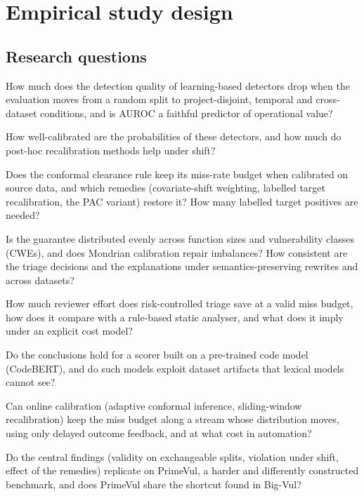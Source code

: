 \section{Empirical study design}\label{sec:design}

\subsection{Research questions}
\begin{description}[leftmargin=2.2em,style=nextline,itemsep=2pt]
\item[RQ1 (Reliability of detection).] How much does the detection quality of learning-based detectors drop when the evaluation moves from a random split to project-disjoint, temporal and cross-dataset conditions, and is AUROC a faithful predictor of operational value?
\item[RQ2 (Calibration).] How well-calibrated are the probabilities of these detectors, and how much do post-hoc recalibration methods help under shift?
\item[RQ3 (Guarantees under shift).] Does the conformal clearance rule keep its miss-rate budget when calibrated on source data, and which remedies (covariate-shift weighting, labelled target recalibration, the PAC variant) restore it? How many labelled target positives are needed?
\item[RQ4 (Accountability).] Is the guarantee distributed evenly across function sizes and vulnerability classes (CWEs), and does Mondrian calibration repair imbalances? How consistent are the triage decisions and the explanations under semantics-preserving rewrites and across datasets?
\item[RQ5 (Operational value).] How much reviewer effort does risk-controlled triage save at a valid miss budget, how does it compare with a rule-based static analyser, and what does it imply under an explicit cost model?
\item[RQ6 (Pre-trained code model).] Do the conclusions hold for a scorer built on a pre-trained code model (CodeBERT), and do such models exploit dataset artifacts that lexical models cannot see?
\item[RQ7 (Drift).] Can online calibration (adaptive conformal inference, sliding-window recalibration) keep the miss budget along a stream whose distribution moves, using only delayed outcome feedback, and at what cost in automation?
\item[RQ8 (Third corpus).] Do the central findings (validity on exchangeable splits, violation under shift, effect of the remedies) replicate on PrimeVul, a harder and differently constructed benchmark, and does PrimeVul share the shortcut found in Big-Vul?
\end{description}

